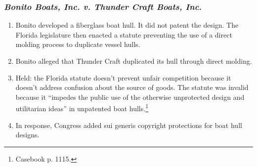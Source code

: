 \subsubsection{\emph{Bonito Boats, Inc. v. Thunder Craft Boats, Inc.}}

\begin{enumerate}
    \item Bonito developed a fiberglass boat hull. It did not patent the 
    design. The Florida legislature then enacted a statute preventing the use 
    of a direct molding process to duplicate vessel hulls.
    \item Bonito alleged that Thunder Craft duplicated its hull through direct 
    molding.
    \item Held: the Florida statute doesn't prevent unfair competition because 
    it doesn't address confusion about the source of goods. The statute was 
    invalid because it ``impedes the public use of the otherwise unprotected 
    design and utilitarian ideas'' in unpatented boat hulls.\footnote{Casebook 
    p. 1115.}
    \item In response, Congress added sui generis copyright protections for 
    boat hull designs.
\end{enumerate}
